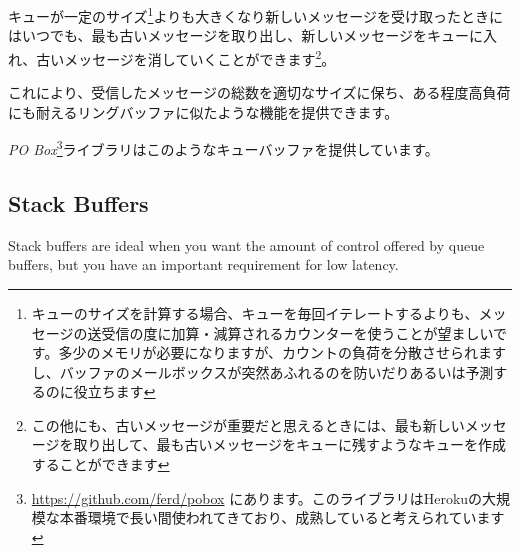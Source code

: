 キューが一定のサイズ\footnote{キューのサイズを計算する場合、キューを毎回イテレートするよりも、メッセージの送受信の度に加算・減算されるカウンターを使うことが望ましいです。多少のメモリが必要になりますが、カウントの負荷を分散させられますし、バッファのメールボックスが突然あふれるのを防いだりあるいは予測するのに役立ちます}よりも大きくなり新しいメッセージを受け取ったときにはいつでも、最も古いメッセージを取り出し、新しいメッセージをキューに入れ、古いメッセージを消していくことができます\footnote{この他にも、古いメッセージが重要だと思えるときには、最も新しいメッセージを取り出して、最も古いメッセージをキューに残すようなキューを作成することができます}。

これにより、受信したメッセージの総数を適切なサイズに保ち、ある程度高負荷にも耐えるリングバッファに似たような機能を提供できます。

\emph{PO Box}\footnote{\href{https://github.com/ferd/pobox}{https://github.com/ferd/pobox} にあります。このライブラリはHerokuの大規模な本番環境で長い間使われてきており、成熟していると考えられています}ライブラリはこのようなキューバッファを提供しています。


\subsection{Stack Buffers}

Stack buffers are ideal when you want the amount of control offered by queue buffers, but you have an important requirement for low latency.

